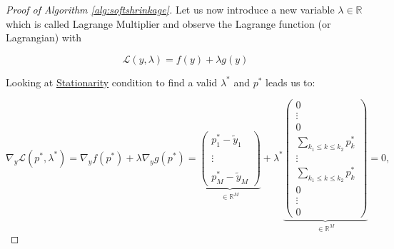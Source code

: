 \begin{proof}[Proof of Algorithm \ref{alg:softshrinkage}]
        Let us now introduce a new variable $\lambda \in \mathbb{R}$ which is called Lagrange Multiplier and observe the Lagrange function (or Lagrangian) with



        \begin{equation}
            \mathcal{L}(y, \lambda) = f(y) + \lambda g(y)%
        \end{equation}

        Looking at \underline{Stationarity} condition to find a valid $\lambda^{\ast}$ and $p^{\ast}$ leads us to:

        \begin{equation}
            \nabla_{y} \mathcal{L}(p^{\ast}, \lambda^{\ast}) = \nabla_{y} f(p^{\ast}) + \lambda \nabla_{y} g(p^{\ast}) =
            \underbrace{\begin{pmatrix}
                p^{\ast}_{1} - \tilde{y}_{1} \\
                 \\
                \vdots \\
                 \\
                p^{\ast}_{M} - \tilde{y}_{M}
            \end{pmatrix}}_{\in \mathbb{R}^{M}}
            + \lambda^{\ast}
            \underbrace{\begin{pmatrix}
                0 \\
                \vdots \\
                0 \\
                \sum\limits_{k_{1} \le k \le k_{2}} p^{\ast}_{k} \\
                \vdots \\
                \sum\limits_{k_{1} \le k \le k_{2}} p^{\ast}_{k} \\
                0 \\
                \vdots \\
                0
            \end{pmatrix}}_{\in \mathbb{R}^{M}}
            = 0,
        \end{equation}


\end{proof}
